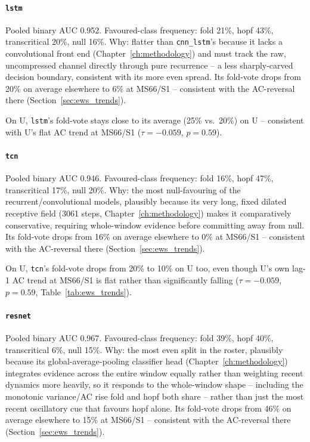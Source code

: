 \paragraph{\texttt{lstm}} Pooled binary AUC 0.952. Favoured-class frequency: fold 21\%, hopf 43\%, transcritical 20\%, null 16\%. Why: flatter than \texttt{cnn\_lstm}'s because it lacks a convolutional front end (Chapter~\ref{ch:methodology}) and must track the raw, uncompressed channel directly through pure recurrence -- a less sharply-carved decision boundary, consistent with its more even spread. Its fold-vote drops from 20\% on average elsewhere to 6\% at MS66/S1 -- consistent with the AC-reversal there (Section~\ref{sec:ews_trends}).

On U, \texttt{lstm}'s fold-vote stays close to its average (25\% vs.\ 20\%) on U -- consistent with U's flat AC trend at MS66/S1 ($\tau=-0.059$, $p=0.59$).

\paragraph{\texttt{tcn}} Pooled binary AUC 0.946. Favoured-class frequency: fold 16\%, hopf 47\%, transcritical 17\%, null 20\%. Why: the most null-favouring of the recurrent/convolutional models, plausibly because its very long, fixed dilated receptive field (3061 steps, Chapter~\ref{ch:methodology}) makes it comparatively conservative, requiring whole-window evidence before committing away from null. Its fold-vote drops from 16\% on average elsewhere to 0\% at MS66/S1 -- consistent with the AC-reversal there (Section~\ref{sec:ews_trends}).

On U, \texttt{tcn}'s fold-vote drops from 20\% to 10\% on U too, even though U's own lag-1 AC trend at MS66/S1 is flat rather than significantly falling ($\tau=-0.059$, $p=0.59$, Table~\ref{tab:ews_trends}).

\paragraph{\texttt{resnet}} Pooled binary AUC 0.967. Favoured-class frequency: fold 39\%, hopf 40\%, transcritical 6\%, null 15\%. Why: the most even split in the roster, plausibly because its global-average-pooling classifier head (Chapter~\ref{ch:methodology}) integrates evidence across the entire window equally rather than weighting recent dynamics more heavily, so it responds to the whole-window shape -- including the monotonic variance/AC rise fold and hopf both share -- rather than just the most recent oscillatory cue that favours hopf alone. Its fold-vote drops from 46\% on average elsewhere to 15\% at MS66/S1 -- consistent with the AC-reversal there (Section~\ref{sec:ews_trends}).

